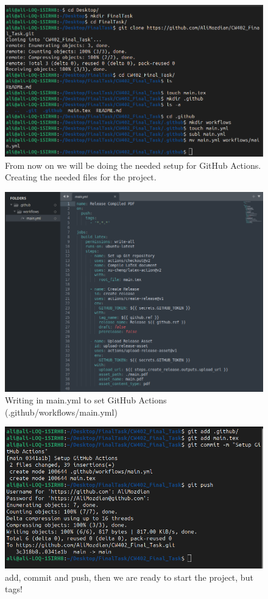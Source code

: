 \documentclass{article}
\begin{document}
	\begin{figure}[h]
		\centering
		\includegraphics[width=\textwidth]{images/ss2.png}
		\caption{From now on we will be doing the needed setup for GitHub Actions. \\ Creating the needed files for the project.}
	\end{figure}
	
	\begin{figure}[h]
		\centering
		\includegraphics[width=\textwidth]{images/ss3.png}
		\caption{Writing in main.yml to set GitHub Actions (.github/workflows/main.yml)}
	\end{figure}
	
	\begin{figure}[h]
		\centering
		\includegraphics[width=\textwidth]{images/ss4.png}
		\caption{add, commit and push, then we are ready to start the project, but tags!}
	\end{figure}
\end{document}

